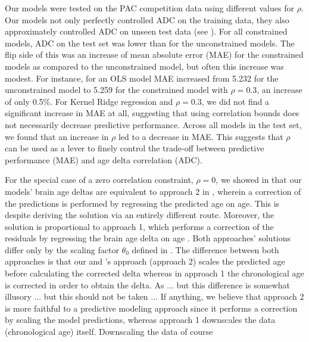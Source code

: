 \documentclass[utf8]{frontiersSCNS} %
\renewcommand{\a}{\theta}
\newcommand{\az}{\a_0}
\begin{document}
Our models were tested on the PAC competition data  using different values for $\rho$. Our models not only perfectly controlled ADC on the training data, they also approximately controlled ADC on unseen test data (see ). For all constrained models, ADC on the test set was lower than for the unconstrained models. The flip side of this was an increase of mean absolute error (MAE) for the constrained models as compared to the unconstrained model, but often this increase was modest. For instance, for an OLS model MAE increased from 5.232 for the unconstrained model to 5.259 for the constrained model with $\rho=0.3$, an increase of only 0.5\%. For Kernel Ridge regression and $\rho=0.3$, we did not find a significant increase in MAE at all, suggesting that using correlation bounds does not necessarily decrease predictive performance. Across all models in the test set, we found that an increase in $\rho$ led to a decrease in MAE. This suggests that $\rho$ can be used as a lever to finely control the trade-off between predictive performance (MAE) and age delta correlation (ADC). 

For the special case of a zero correlation constraint, $\rho = 0$, we showed in  that our models' brain age deltas are equivalent to approach 2 in   \citep{Le2018ABrainAGE}, wherein a correction of the predictions is performed by regressing the predicted age on age. This is despite deriving the solution via an entirely different route. Moreover, the solution is proportional to approach 1, which performs a correction of the residuals by regressing the brain age delta on age \citep{Cole2018BrainMortality,deLange2020Commentary:Prediction,Le2018ABrainAGE,Smith2019EstimationImaging,Beheshti2019Bias-adjustmentScheme}. Both approaches' solutions differ only by the scaling factor $\az$ defined in . The difference between both approaches is that our and \cite{Cole2018BrainMortality}'s approach (approach 2) scales the predicted age before calculating the corrected delta whereas in approach 1 the chronological age is corrected in order to obtain the delta. As ... but this difference is somewhat illusory ... but this should not be taken  \citep{Beheshti2019Bias-adjustmentScheme} ... If anything, we believe that approach 2 is more faithful to a predictive modeling approach since it performs a correction by scaling the model predictions, whereas approach 1 downscales the data (chronological age) itself. Downscaling the data of course 
\end{document}
